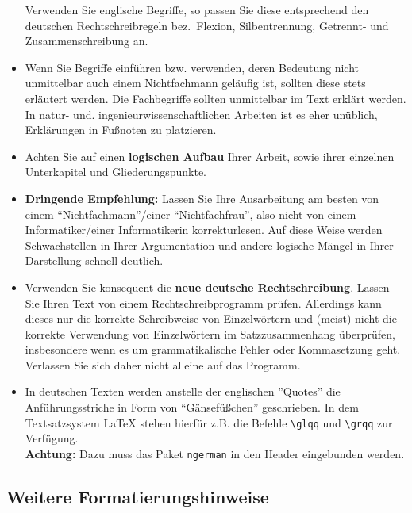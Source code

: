 \begin{itemize}
Verwenden Sie englische Begriffe, so passen Sie diese entsprechend den deutschen Rechtschreibregeln bez.~Flexion, Silbentrennung, Getrennt- und Zusammenschreibung an.
\item Wenn Sie Begriffe einführen bzw. verwenden, deren Bedeutung nicht unmittelbar auch einem Nichtfachmann geläufig ist, sollten diese stets erläutert werden. 
Die Fachbegriffe sollten unmittelbar im Text erklärt werden. 
In natur- und. ingenieurwissenschaftlichen Arbeiten ist es eher unüblich, Erklärungen in Fußnoten zu platzieren. 
\item Achten Sie auf einen {\bf logischen Aufbau} Ihrer Arbeit, sowie ihrer einzelnen Unterkapitel und Gliederungspunkte.
\item {\bf Dringende Empfehlung:} Lassen Sie Ihre Ausarbeitung am besten von einem "`Nichtfachmann"'/einer "`Nichtfachfrau"', also nicht von einem Informatiker/einer Informatikerin korrekturlesen.
Auf diese Weise werden Schwachstellen in Ihrer Argumentation und andere logische Mängel in Ihrer Darstellung schnell deutlich.
\item Verwenden Sie konsequent die {\bf neue deutsche Rechtschreibung}.
Lassen Sie Ihren Text von einem Rechtschreibprogramm prüfen.
Allerdings kann dieses nur die korrekte Schreibweise von Einzelwörtern und (meist) nicht die korrekte Verwendung von Einzelwörtern im Satzzusammenhang überprüfen, insbesondere wenn es um grammatikalische Fehler oder Kommasetzung geht.
Verlassen Sie sich daher nicht alleine auf das Programm.
\item In deutschen Texten werden anstelle der englischen ''Quotes'' die Anführungsstriche in Form von "`Gänsefüßchen"' geschrieben. 
In dem Textsatzsystem {\LaTeX} stehen hierfür z.B. die Befehle \verb|\glqq| und \verb|\grqq| zur Verfügung. \\
{\bf Achtung:} Dazu muss das Paket {\tt ngerman} in den Header eingebunden werden.
\end{itemize}



\subsection{Weitere Formatierungshinweise}
